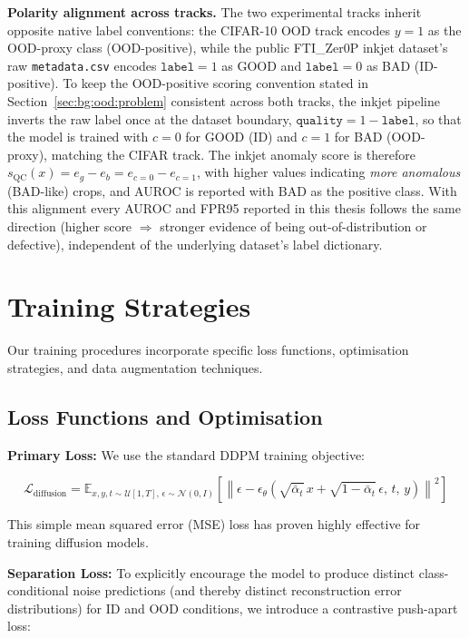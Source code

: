 \textbf{Polarity alignment across tracks.}
The two experimental tracks inherit opposite native label conventions: the CIFAR-10 OOD track encodes $y = 1$ as the OOD-proxy class (OOD-positive), while the public FTI\_Zer0P inkjet dataset's raw \texttt{metadata.csv} encodes $\texttt{label} = 1$ as GOOD and $\texttt{label} = 0$ as BAD (ID-positive). To keep the OOD-positive scoring convention stated in Section~\ref{sec:bg:ood:problem} consistent across both tracks, the inkjet pipeline inverts the raw label once at the dataset boundary, $\texttt{quality} = 1 - \texttt{label}$, so that the model is trained with $c = 0$ for GOOD (ID) and $c = 1$ for BAD (OOD-proxy), matching the CIFAR track. The inkjet anomaly score is therefore $s_{\text{QC}}(x) = e_g - e_b = e_{c=0} - e_{c=1}$, with higher values indicating \emph{more anomalous} (BAD-like) crops, and AUROC is reported with BAD as the positive class. With this alignment every AUROC and FPR95 reported in this thesis follows the same direction (higher score $\Rightarrow$ stronger evidence of being out-of-distribution or defective), independent of the underlying dataset's label dictionary.

\section{Training Strategies}
\label{sec:meth:training}

Our training procedures incorporate specific loss functions, optimisation strategies, and data augmentation techniques.

\subsection{Loss Functions and Optimisation}
\label{sec:meth:training:loss}

\textbf{Primary Loss:} We use the standard DDPM training objective:

\begin{equation}
\label{eq:meth:ldiffusion}
\mathcal{L}_{\text{diffusion}} = \mathbb{E}_{x,y,t \sim \mathcal{U}[1,T],\,\epsilon \sim \mathcal{N}(0,I)} \left[ \left\| \epsilon - \epsilon_\theta\!\left( \sqrt{\bar{\alpha}_t}\, x + \sqrt{1 - \bar{\alpha}_t}\,\epsilon,\, t,\, y \right) \right\|^2 \right]
\end{equation}

This simple mean squared error (MSE) loss has proven highly effective for training diffusion models.

\textbf{Separation Loss:} To explicitly encourage the model to produce distinct class-conditional noise predictions (and thereby distinct reconstruction error distributions) for ID and OOD conditions, we introduce a contrastive push-apart loss:

